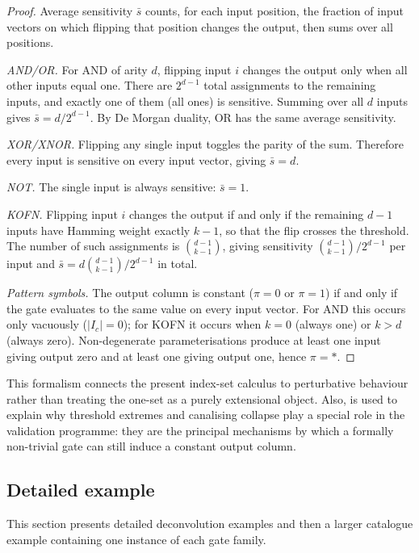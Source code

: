 \documentclass[11pt]{article}
\theoremstyle{definition}
\newcommand{\Ic}{I_c}
\begin{document}
\begin{proof}
Average sensitivity \(\bar{s}\) counts, for each input position, the fraction of input vectors on which flipping that position changes the output, then sums over all positions.

\emph{AND/OR.} For AND of arity \(d\), flipping input \(i\) changes the output only when all other inputs equal one. There are \(2^{d-1}\) total assignments to the remaining inputs, and exactly one of them (all ones) is sensitive. Summing over all \(d\) inputs gives \(\bar{s}=d/2^{d-1}\). By De Morgan duality, OR has the same average sensitivity.

\emph{XOR/XNOR.} Flipping any single input toggles the parity of the sum. Therefore every input is sensitive on every input vector, giving \(\bar{s}=d\).

\emph{NOT.} The single input is always sensitive: \(\bar{s}=1\).

\emph{KOFN.} Flipping input \(i\) changes the output if and only if the remaining \(d-1\) inputs have Hamming weight exactly \(k-1\), so that the flip crosses the threshold. The number of such assignments is \(\binom{d-1}{k-1}\), giving sensitivity \(\binom{d-1}{k-1}/2^{d-1}\) per input and \(\bar{s}=d\binom{d-1}{k-1}/2^{d-1}\) in total.

\emph{Pattern symbols.} The output column is constant (\(\pi=0\) or \(\pi=1\)) if and only if the gate evaluates to the same value on every input vector. For AND this occurs only vacuously (\(|\Ic|=0\)); for KOFN it occurs when \(k=0\) (always one) or \(k>d\) (always zero). Non-degenerate parameterisations produce at least one input giving output zero and at least one giving output one, hence \(\pi=*\).
\end{proof}

This formalism connects the present index-set calculus to perturbative 
behaviour rather than treating the one-set as a purely extensional object. 
Also, is used to explain why threshold extremes and canalising collapse 
play a special role in the validation programme: they are the principal 
mechanisms by which a formally non-trivial gate can still induce a constant output column.

\subsection{Detailed example}
This section presents detailed deconvolution examples and then a larger catalogue example containing one instance of each gate family.
\end{document}
